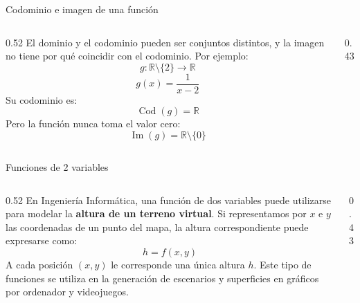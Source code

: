 \documentclass[main.tex]{subfiles}
\begin{document}
\begin{frame}{Codominio e imagen de una función}
\begin{columns}[c]
\begin{column}{0.52\textwidth}
El dominio y el codominio pueden ser conjuntos distintos, y la imagen no tiene por qué coincidir con el codominio.
\vspace{0.4cm}
Por ejemplo:
\[g:\mathbb{R}\setminus\{2\}\rightarrow\mathbb{R}\]
\[g(x)=\frac{1}{x-2}\]
Su codominio es:
\[\operatorname{Cod}(g)=\mathbb{R}\]
Pero la función nunca toma el valor cero:
\[\operatorname{Im}(g)=\mathbb{R}\setminus\{0\}\]
\end{column}
\begin{column}{0.43\textwidth}
\centering
{}
\end{column}
\end{columns}
\end{frame}



\begin{frame}{Funciones de 2 variables}
\begin{columns}[c]
\begin{column}{0.52\textwidth}
En Ingeniería Informática, una función de dos variables puede utilizarse para modelar la \textbf{altura de un terreno virtual}.
\vspace{0.4cm}
Si representamos por $x$ e $y$ las coordenadas de un punto del mapa, la altura correspondiente puede expresarse como:
\[h=f(x,y)\]
A cada posición $(x,y)$ le corresponde una única altura $h$.
\vspace{0.4cm}
Este tipo de funciones se utiliza en la generación de escenarios y superficies en gráficos por ordenador y videojuegos.
\end{column}
\begin{column}{0.43\textwidth}
\centering
{}
\end{column}
\end{columns}
\end{frame}
\end{document}
